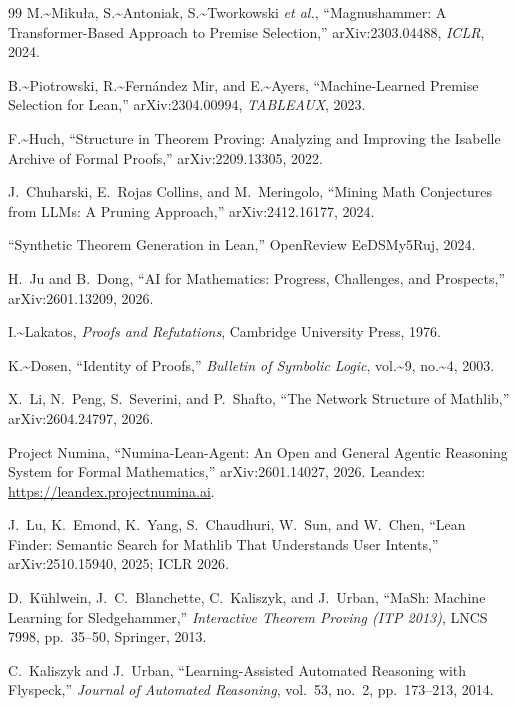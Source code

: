 \documentclass[12pt,a4paper]{article}
\theoremstyle{remark}
\begin{document}
\begin{thebibliography}{99}
M.\textasciitilde{}Miku{\l}a, S.\textasciitilde{}Antoniak, S.\textasciitilde{}Tworkowski \emph{et al.}, ``Magnushammer: A Transformer-Based Approach to Premise Selection,''
arXiv:2303.04488, \emph{ICLR}, 2024.

B.\textasciitilde{}Piotrowski, R.\textasciitilde{}Fern\'andez Mir, and E.\textasciitilde{}Ayers, ``Machine-Learned Premise Selection for Lean,''
arXiv:2304.00994, \emph{TABLEAUX}, 2023.

F.\textasciitilde{}Huch, ``Structure in Theorem Proving: Analyzing and Improving the Isabelle Archive of Formal Proofs,''
arXiv:2209.13305, 2022.

J.~Chuharski, E.~Rojas Collins, and M.~Meringolo,
``Mining Math Conjectures from LLMs: A Pruning Approach,''
arXiv:2412.16177, 2024.

``Synthetic Theorem Generation in Lean,''
OpenReview EeDSMy5Ruj, 2024.

H.~Ju and B.~Dong, ``AI for Mathematics: Progress, Challenges, and Prospects,''
arXiv:2601.13209, 2026.

I.\textasciitilde{}Lakatos, \emph{Proofs and Refutations}, Cambridge University Press, 1976.

K.\textasciitilde{}Dosen, ``Identity of Proofs,''
\emph{Bulletin of Symbolic Logic}, vol.\textasciitilde{}9, no.\textasciitilde{}4, 2003.

X.~Li, N.~Peng, S.~Severini, and P.~Shafto, ``The Network Structure of Mathlib,''
arXiv:2604.24797, 2026.

Project Numina, ``Numina-Lean-Agent: An Open and General Agentic Reasoning
System for Formal Mathematics,'' arXiv:2601.14027, 2026.
Leandex: \url{https://leandex.projectnumina.ai}.

J.~Lu, K.~Emond, K.~Yang, S.~Chaudhuri, W.~Sun, and W.~Chen,
``Lean Finder: Semantic Search for Mathlib That Understands User Intents,''
arXiv:2510.15940, 2025; ICLR 2026.

D.~K\"uhlwein, J.~C.~Blanchette, C.~Kaliszyk, and J.~Urban,
``MaSh: Machine Learning for Sledgehammer,''
\emph{Interactive Theorem Proving (ITP 2013)}, LNCS 7998, pp.~35--50, Springer, 2013.

C.~Kaliszyk and J.~Urban, ``Learning-Assisted Automated Reasoning with Flyspeck,''
\emph{Journal of Automated Reasoning}, vol.~53, no.~2, pp.~173--213, 2014.

\end{thebibliography}
\end{document}

